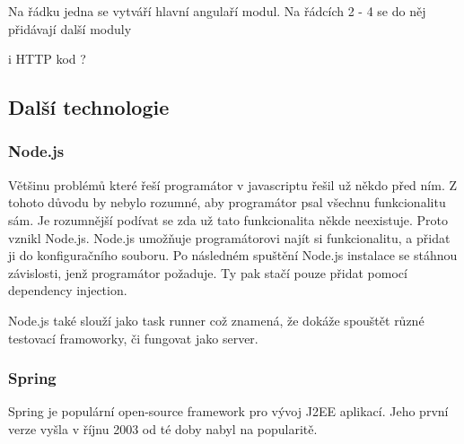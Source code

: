 \documentclass[czech,master,public,dept460,male,cpdeclaration,twoside]{diploma}
\begin{document}
Na řádku jedna se vytváří hlavní angulaří modul. Na řádcích 2 - 4 se do něj přidávají další moduly

i HTTP kod ?
\subsection{Další technologie}

\subsubsection{Node.js}
Většinu problémů které řeší programátor v javascriptu řešil už někdo před ním. Z tohoto důvodu by nebylo rozumné, aby programátor psal všechnu funkcionalitu sám. Je rozumnější podívat se zda už tato funkcionalita někde neexistuje. Proto vznikl Node.js. Node.js umožňuje programátorovi najít si funkcionalitu, a přidat ji do konfiguračního souboru. Po následném spuštění Node.js instalace se stáhnou závislosti, jenž programátor požaduje. Ty pak stačí pouze přidat pomocí dependency injection.

Node.js také slouží jako task runner což znamená, že dokáže spouštět různé testovací framoworky, či fungovat jako server.

\subsubsection{Spring}
Spring je populární open-source framework pro vývoj J2EE aplikací. Jeho první verze vyšla v říjnu 2003 od té doby nabyl na popularitě. 
\end{document}
